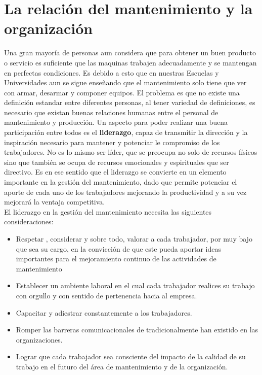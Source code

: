 \documentclass[
	12pt, %
	fleqn, %
	a4paper, %
]{LegrandOrangeBook}
\begin{document}
\section{La relación del mantenimiento y la organización}
Una gran mayoría de personas aun considera que para
obtener un buen producto o servicio es suficiente que las maquinas trabajen adecuadamente y se mantengan en
perfectas condiciones. Es debido a esto que en nuestras Escuelas y Universidades aun se sigue
enseñando que el mantenimiento solo tiene que ver con
armar, desarmar y componer equipos. El problema es que no existe una definición estandar entre diferentes personas, al tener variedad de definiciones, es necesario que existan buenas relaciones humanas entre el personal de mantenimiento y producción. Un aspecto para poder realizar una buena participación entre todos es el \textbf{liderazgo}, capaz de transmitir la dirección y la inspiración necesario para mantener y potenciar le compromiso de los trabajadores. No es lo mismo ser líder, que se preocupa no solo de recursos físicos sino que también se ocupa de recursos emocionales y espirituales que ser directivo. Es en ese sentido que el liderazgo se convierte en un elemento importante en la gestión del mantenimiento, dado que permite potenciar el aporte de cada uno de los trabajadores mejorando la productividad y a su vez mejorará la ventaja competitiva.\\
El liderazgo en la gestión del mantenimiento necesita las siguientes consideraciones:
\begin{itemize}
\item Respetar , considerar y sobre todo, valorar a cada trabajador, por muy bajo que sea su cargo, en la convicción de que este pueda aportar ideas importantes para el mejoramiento continuo de las actividades de mantenimiento
\item Establecer un ambiente laboral en el cual cada trabajador realices su trabajo con orgullo y con sentido de pertenencia hacia al empresa. 
\item Capacitar y adiestrar constantemente a los trabajadores.
\item Romper las barreras comunicacionales de tradicionalmente han existido en las organizaciones.
\item Lograr que cada trabajador sea consciente del impacto de la calidad de su trabajo en el futuro del área de mantenimiento y de la organización.
\end{itemize}
\end{document}
